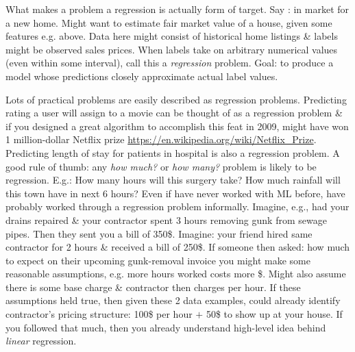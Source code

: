 \documentclass{article}
\begin{document}
\begin{itemize}
\begin{itemize}
\begin{itemize}
\begin{itemize}
				What makes a problem a regression is actually form of target. Say : in market for a new home. Might want to estimate fair market value of a house, given some features e.g. above. Data here might consist of historical home listings \& labels might be observed sales prices. When labels take on arbitrary numerical values (even within some interval), call this a {\it regression} problem. Goal: to produce a model whose predictions closely approximate actual label values.
				
				Lots of practical problems are easily described as regression problems. Predicting rating a user will assign to a movie can be thought of as a regression problem \& if you designed a great algorithm to accomplish this feat in 2009, might have won 1 million-dollar Netflix prize \url{https://en.wikipedia.org/wiki/Netflix_Prize}. Predicting length of stay for patients in hospital is also a regression problem. A good rule of thumb: any {\it how much?} or {\it how many?} problem is likely to be regression. E.g.: How many hours will this surgery take? How much rainfall will this town have in next 6 hours? Even if have never worked with ML before, have probably worked through a regression problem informally. Imagine, e.g., had your drains repaired \& your contractor spent 3 hours removing gunk from sewage pipes. Then they sent you a bill of 350\$. Imagine: your friend hired same contractor for 2 hours \& received a bill of 250\$. If someone then asked: how much to expect on their upcoming gunk-removal invoice you might make some reasonable assumptions, e.g. more hours worked costs more \$. Might also assume there is some base charge \& contractor then charges per hour. If these assumptions held true, then given these 2 data examples, could already identify contractor's pricing structure: 100\$ per hour $+$ 50\$ to show up at your house. If you followed that much, then you already understand high-level idea behind {\it linear} regression.
				

\end{itemize}
\end{itemize}
\end{itemize}
\end{itemize}
\end{document}
